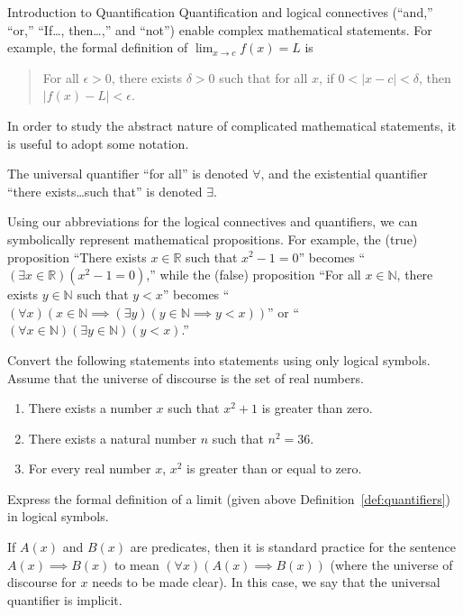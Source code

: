 \begin{section}{Introduction to Quantification}
Quantification and logical connectives (``and,'' ``or,'' ``If\ldots, then\ldots,'' and ``not'') enable complex mathematical statements. For example, the formal definition of $\lim_{x\to c}f(x)=L$ is 
\begin{quote}
For all $\epsilon >0$, there exists $\delta >0$ such that for all $x$, if $0<|x-c|<\delta$, then $|f(x)-L|<\epsilon$.
\end{quote}

In order to study the abstract nature of complicated mathematical statements, it is useful to adopt some notation.

\begin{definition}\label{def:quantifiers}
The universal quantifier ``for all'' is denoted $\boxed{\forall}$, and the existential quantifier  ``there exists\ldots such that'' is denoted $\boxed{\exists}$.
\end{definition}

Using our abbreviations for the logical connectives and quantifiers, we can symbolically represent mathematical propositions. For example, the (true) proposition ``There exists $x \in \mathbb{R}$ such that $x^2-1=0$'' becomes ``$(\exists x \in \mathbb{R})(x^2-1=0)$,'' while the (false) proposition ``For all $x\in \mathbb{N}$, there exists $y\in\mathbb{N}$ such that $y<x$'' becomes ``$(\forall x)(x\in\mathbb{N}\implies (\exists y)(y\in\mathbb{N}\implies y<x))$'' or ``$(\forall x\in\mathbb{N})(\exists y\in\mathbb{N})(y<x)$.''

\begin{problem} Convert the following statements into statements using only logical symbols.  Assume that the universe of discourse is the set of real numbers.
\begin{enumerate}[label=\textrm{(\alph*)}]
\item There exists a number $x$ such that $x^2+1$ is greater than zero.
\item There exists a natural number $n$ such that $n^2=36$. 
\item For every real number $x$, $x^2$ is greater than or equal to zero.
\end{enumerate}
\end{problem}

\begin{problem}
Express the formal definition of a limit (given above Definition~\ref{def:quantifiers}) in logical symbols.
\end{problem}

If $A(x)$ and $B(x)$ are predicates, then it is standard practice for the sentence $A(x)\implies B(x)$ to mean $(\forall x)(A(x)\implies B(x))$ (where the universe of discourse for $x$ needs to be made clear).  In this case, we say that the universal quantifier is implicit.


\end{section}

